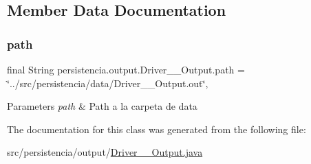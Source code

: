 \subsection{Member Data Documentation}
\mbox{\label{classpersistencia_1_1output_1_1Driver____Output_a1701bae356c7bf388a5466895c22ff64}} 
\subsubsection{\texorpdfstring{path}{path}}
{\footnotesize\ttfamily final String persistencia.\+output.\+Driver\+\_\+\+\_\+\+Output.\+path = \char`\"{}../src/persistencia/data/Driver\+\_\+\+\_\+\+Output.\+out\char`\"{}\hspace{0.3cm}{\ttfamily [static]}, {\ttfamily [package]}}


\begin{DoxyParams}{Parameters}
{\em path} & Path a la carpeta de data \\
\hline
\end{DoxyParams}


The documentation for this class was generated from the following file\+:\begin{DoxyCompactItemize}
\item 
src/persistencia/output/\hyperlink{Driver____Output_8java}{Driver\+\_\+\+\_\+\+Output.\+java}\end{DoxyCompactItemize}

